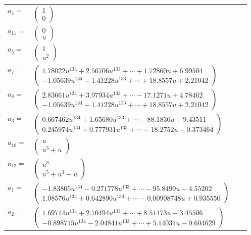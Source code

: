\documentclass[1p]{elsarticle_modified}
\theoremstyle{definition}
\begin{document}
\begin{tabular}{m{7pt} m{180pt} m{7pt} m{180pt} }
\flushright $a_{4}=$&$\begin{pmatrix}1\\0\end{pmatrix}$ \\
\flushright $a_{11}=$&$\begin{pmatrix}0\\u\end{pmatrix}$ \\
\flushright $a_{5}=$&$\begin{pmatrix}1\\u^2\end{pmatrix}$ \\
\flushright $a_{7}=$&$\begin{pmatrix}1.78022 u^{134}+2.56706 u^{133}+\cdots+1.72860 u+6.99504\\-1.05639 u^{134}-1.41228 u^{133}+\cdots+18.8557 u+2.21042\end{pmatrix}$ \\
\flushright $a_{8}=$&$\begin{pmatrix}2.83661 u^{134}+3.97934 u^{133}+\cdots-17.1271 u+4.78462\\-1.05639 u^{134}-1.41228 u^{133}+\cdots+18.8557 u+2.21042\end{pmatrix}$ \\
\flushright $a_{3}=$&$\begin{pmatrix}0.667462 u^{134}+1.65680 u^{133}+\cdots-88.1836 u-9.43511\\0.245974 u^{134}+0.777931 u^{133}+\cdots-18.2752 u-0.373464\end{pmatrix}$ \\
\flushright $a_{10}=$&$\begin{pmatrix}u\\u^3+u\end{pmatrix}$ \\
\flushright $a_{12}=$&$\begin{pmatrix}u^3\\u^5+u^3+u\end{pmatrix}$ \\
\flushright $a_{1}=$&$\begin{pmatrix}-1.83805 u^{134}-0.271778 u^{133}+\cdots-95.8499 u-4.55202\\1.08576 u^{134}+0.642890 u^{133}+\cdots-0.00908748 u+0.935550\end{pmatrix}$ \\
\flushright $a_{2}=$&$\begin{pmatrix}1.69714 u^{134}+2.70494 u^{133}+\cdots+8.51473 u-3.45506\\-0.898715 u^{134}-2.04841 u^{133}+\cdots+5.14031 u-0.604629\end{pmatrix}$ \\

\end{tabular}
\end{document}
